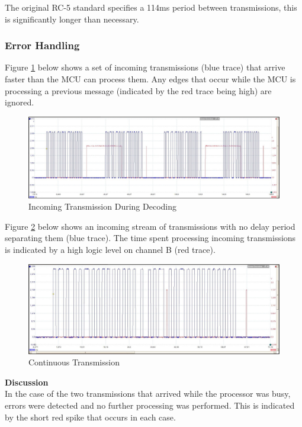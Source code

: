 The original RC-5 standard specifies a 114ms period between transmissions, this is significantly longer than necessary.


\subsubsection{Error Handling}
Figure \ref{fig:transmission_too_fast} below shows a set of incoming transmissions (blue trace) that arrive faster than the MCU can process them. Any edges that occur while the MCU is processing a previous message (indicated by the red trace being high) are ignored.

\begin{figure}[H]
	\centering
	\includegraphics[width=.8\textwidth]{figures/results/receiver_software/transmission_too_fast_crop_crop.JPG}
	\caption{Incoming Transmission During Decoding}
	\label{fig:transmission_too_fast}
\end{figure}

Figure \ref{fig:transmission_too_many_edges} below shows an incoming stream of transmissions with no delay period separating them (blue trace). The time spent processing incoming transmissions is indicated by a high logic level on channel B (red trace).

\begin{figure}[H]
	\centering
	\includegraphics[width=.8\textwidth]{figures/results/receiver_software/transmission_too_many_edges_crop_crop.JPG}
	\caption{Continuous Transmission}
	\label{fig:transmission_too_many_edges}
\end{figure}

\textbf{Discussion}\\
In the case of the two transmissions that arrived while the processor was busy, errors were detected and no further processing was performed. This is indicated by the short red spike that occurs in each case.


